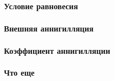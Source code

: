 	\begin{frame}
		\frametitle{Условие равновесия}
		
	\end{frame}
	
	\begin{frame}
		\frametitle{Внешняя аннигилляция}
		
	\end{frame}
	
	\begin{frame}
		\frametitle{Коэффициент аннигилляции}
		
	\end{frame}
	
	\begin{frame}
		\frametitle{Что еще}
		
	\end{frame}
 

